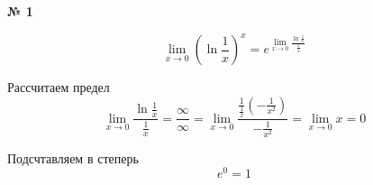 \documentclass{article}
\begin{document}
\textbf{№ 1} 

\begingroup
\Large

$$ \lim\limits_{x \to 0} \left( \ln{\frac{1}{x}} \right)^{x}
= e^{\lim\limits_{x \to 0}\frac{\ln{\frac{1}{x}}}{\frac{1}{x}}} $$

Рассчитаем предел
$$ \lim\limits_{x \to 0} \frac{\ln{\frac{1}{x}}}{\frac{1}{x}}
= \frac{\infty}{\infty}
= \lim\limits_{x \to 0} \frac{ \frac{1}{\frac{1}{x}} \left( -\frac{1}{x^2} \right)}{-\frac{1}{x^2}} 
= \lim\limits_{x \to 0} x 
= 0 $$

Подсчтавляем в степерь
$$ e^{0}
= 1 $$

\endgroup
\end{document}
